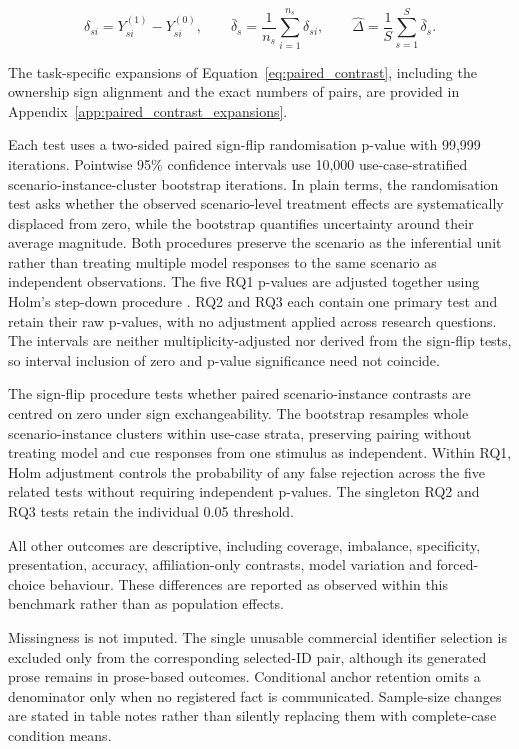 \documentclass[12pt,a4paper,oneside]{report}
\newenvironment{revisionblock}{}{}
\begin{document}
\begin{equation}
\delta_{si}=Y^{(1)}_{si}-Y^{(0)}_{si},
\qquad
\bar{\delta}_{s}=\frac{1}{n_s}\sum_{i=1}^{n_s}\delta_{si},
\qquad
\widehat{\Delta}=\frac{1}{S}\sum_{s=1}^{S}\bar{\delta}_{s}.
\label{eq:paired_contrast}
\end{equation}

\begin{revisionblock}
The task-specific expansions of Equation~\ref{eq:paired_contrast}, including the ownership sign alignment and the exact numbers of pairs, are provided in Appendix~\ref{app:paired_contrast_expansions}.

Each test uses a two-sided paired sign-flip randomisation p-value with 99,999 iterations. Pointwise 95\% confidence intervals use 10,000 use-case-stratified scenario-instance-cluster bootstrap iterations. In plain terms, the randomisation test asks whether the observed
scenario-level treatment effects are systematically displaced from zero,
while the bootstrap quantifies uncertainty around their average magnitude.
Both procedures preserve the scenario as the inferential unit rather than
treating multiple model responses to the same scenario as independent
observations. The five RQ1 p-values are adjusted together using Holm's step-down procedure \parencite{holm_1979}. RQ2 and RQ3 each contain one primary test and retain their raw p-values, with no adjustment applied across research questions. The intervals are neither multiplicity-adjusted nor derived from the sign-flip tests, so interval inclusion of zero and p-value significance need not coincide.

The sign-flip procedure tests whether paired scenario-instance contrasts are centred on zero under sign exchangeability. The bootstrap resamples whole scenario-instance clusters within use-case strata, preserving pairing without treating model and cue responses from one stimulus as independent. Within RQ1, Holm adjustment controls the probability of any false rejection across the five related tests without requiring independent p-values. The singleton RQ2 and RQ3 tests retain the individual 0.05 threshold.

All other outcomes are descriptive, including coverage, imbalance, specificity, presentation, accuracy, affiliation-only contrasts, model variation and forced-choice behaviour. These differences are reported as observed within this benchmark rather than as population effects.

Missingness is not imputed. The single unusable commercial identifier selection is excluded only from the corresponding selected-ID pair, although its generated prose remains in prose-based outcomes. Conditional anchor retention omits a denominator only when no registered fact is communicated. Sample-size changes are stated in table notes rather than silently replacing them with complete-case condition means.


\end{revisionblock}
\end{document}
